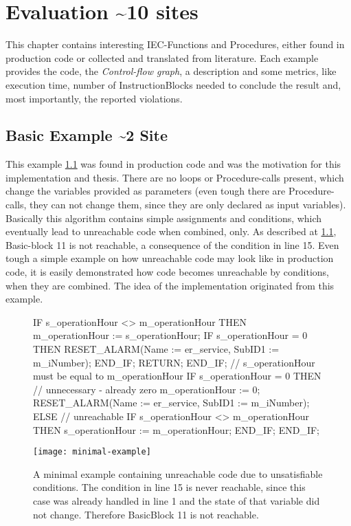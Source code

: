 
\chapter {Evaluation \textasciitilde 10 sites}
\label {cha:evaluation}
This chapter contains interesting IEC-Functions and Procedures, either found in production code or collected and translated from literature.
Each example provides the code, the \emph{Control-flow graph}, a description and some metrics, like execution time, number of InstructionBlocks needed to conclude the result and, most importantly, the reported violations.


\section{Basic Example \textasciitilde 2 Site}
This example \ref{code:basic example 1} was found in production code and was the motivation for this implementation and thesis. There are no loops or Procedure-calls present, which change the variables provided as parameters (even tough there are Procedure-calls, they can not change them, since they are only declared as input variables).
Basically this algorithm contains simple assignments and conditions, which eventually lead to unreachable code when combined, only.
As described at \ref{code:basic example 1}, Basic-block 11 is not reachable, a consequence of the condition in line 15.
Even tough a simple example on how unreachable code may look like in production code, it is easily demonstrated how code becomes unreachable by conditions, when they are combined.
The idea of the implementation originated from this example.


\begin{figure}[h!]
	\begin{GenericCode}
		IF s_operationHour <> m_operationHour THEN
			m_operationHour := s_operationHour;
			IF s_operationHour = 0 THEN
				RESET_ALARM(Name := er_service, SubID1 := m_iNumber);
			END_IF;
			RETURN;
		END_IF;
		// s_operationHour must be equal to m_operationHour
		IF s_operationHour = 0 THEN
			// unnecessary - already zero
			m_operationHour := 0;
			RESET_ALARM(Name := er_service, SubID1 := m_iNumber);
		ELSE
			// unreachable
			IF s_operationHour <> m_operationHour THEN
				s_operationHour := m_operationHour;
			END_IF;
		END_IF;
	\end{GenericCode}
	\centering
	\texttt{[image: minimal-example]}
	\caption{A minimal example containing unreachable code due to unsatisfiable conditions. The condition in line 15 is never reachable, since this case was already handled in line 1 and the state of that variable did not change. Therefore BasicBlock 11 is not reachable.}
	\label{code:basic example 1}
\end{figure}

